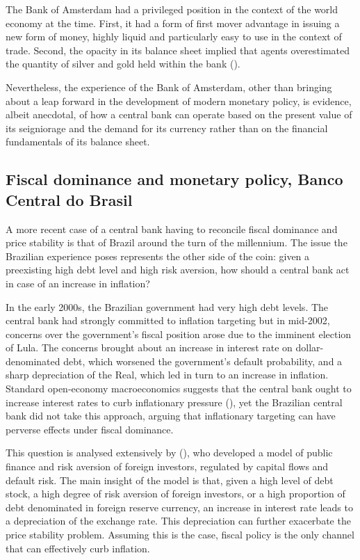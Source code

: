 \documentclass[american]{scrartcl}
\newcommand{\citein}[1]{\citeauthor{#1} (\citeyear{#1})}
\begin{document}
The Bank of Amsterdam had a privileged position in the context of the world economy at the time. First, it had a form of first mover advantage in issuing a new form of money, highly liquid and particularly easy to use in the context of trade. Second, the opacity in its balance sheet implied that agents overestimated the quantity of silver and gold held within the bank (\cite[p. 11]{Quinn2014}).

Nevertheless, the experience of the Bank of Amsterdam, other than bringing about a leap forward in the development of modern monetary policy, is evidence, albeit anecdotal, of how a central bank can operate based on the present value of its seigniorage and the demand for its currency rather than on the financial fundamentals of its balance sheet.


\subsection{Fiscal dominance and monetary policy, Banco Central do Brasil}

A more recent case of a central bank having to reconcile fiscal dominance and price stability is that of Brazil around the turn of the millennium. The issue the Brazilian experience poses represents the other side of the coin: given a preexisting high debt level and high risk aversion, how should a central bank act in case of an increase in inflation?

In the early 2000s, the Brazilian government had very high debt levels. The central bank had strongly committed to inflation targeting but in mid-2002, concerns over the government's fiscal position arose due to the imminent election of Lula. The concerns brought about an increase in interest rate on dollar-denominated debt, which worsened the government's default probability, and a sharp depreciation of the Real, which led in turn to an increase in inflation. Standard open-economy macroeconomics suggests that the central bank ought to increase interest rates to curb inflationary pressure (\cite[p. 3]{Blanchard2004}), yet the Brazilian central bank did not take this approach, arguing that inflationary targeting can have perverse effects under fiscal dominance.

This question is analysed extensively by \citein{Blanchard2004}, who developed a model of public finance and risk aversion of foreign investors, regulated by capital flows and default risk. The main insight of the model is that, given a high level of debt stock, a high degree of risk aversion of foreign investors, or a high proportion of debt denominated in foreign reserve currency, an increase in interest rate leads to a depreciation of the exchange rate. This depreciation can further exacerbate the price stability problem. Assuming this is the case, fiscal policy is the only channel that can effectively curb inflation.
\end{document}
